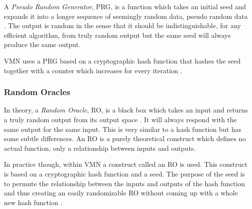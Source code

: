 A \emph{Pseudo Random Generator}, PRG, is a function which takes an
initial seed and expands it into a longer sequence of seemingly random
data, pseudo random data \cite[p.~170]{hac}. The output is random in
the sense that it should be indistinguishable, for any efficient
algorithm, from truly random output but the same seed will always
produce the same output.

VMN uses a PRG based on a cryptographic hash function that hashes the
seed together with a counter which increases for every iteration
\cite{wikstrom1}.

\subsubsection{Random Oracles}

In theory, a \emph{Random Oracle}, RO, is a black box which takes an
input and returns a truly random output from its output space
\cite{oracle}. It will always respond with the same output for the
same input. This is very similar to a hash function but has some
subtle differences. An RO is a purely theoretical construct which
defines no actual function, only a relationship between inputs and
outputs.

In practice though, within VMN a construct called an RO is used. This
construct is based on a cryptographic hash function and a seed. The
purpose of the seed is to permute the relationship between the inputs
and outputs of the hash function and thus creating an easily
randomizable RO without coming up with a whole new hash function
\cite{wikstrom1}.
